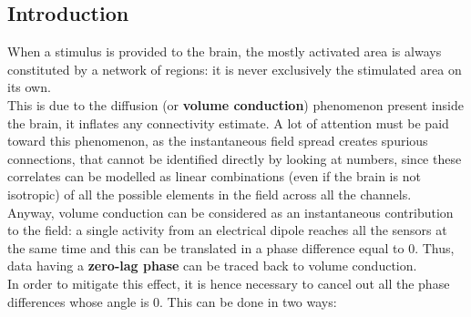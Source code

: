 \subsection{Introduction}
When a stimulus is provided to the brain, the mostly activated area is always constituted by a network
of regions: it is never exclusively the stimulated area on its own.\\
This is due to the diffusion (or \textbf{volume conduction}) phenomenon present inside the brain, it inflates any
connectivity estimate. A lot of attention must be paid toward this phenomenon, as the instantaneous
field spread creates spurious connections, that cannot be identified directly by looking at numbers,
since these correlates can be modelled as linear combinations (even if the brain is not isotropic) of
all the possible elements in the field across all the channels.\\
Anyway, volume conduction can be considered as an instantaneous contribution to the field: a single
activity from an electrical dipole reaches all the sensors at the same time and this can be translated
in a phase difference equal to 0. Thus, data having a \textbf{zero-lag phase} can be traced back to
volume conduction.\\
In order to mitigate this effect, it is hence necessary to cancel out all the phase differences whose
angle is 0. This can be done in two ways:
